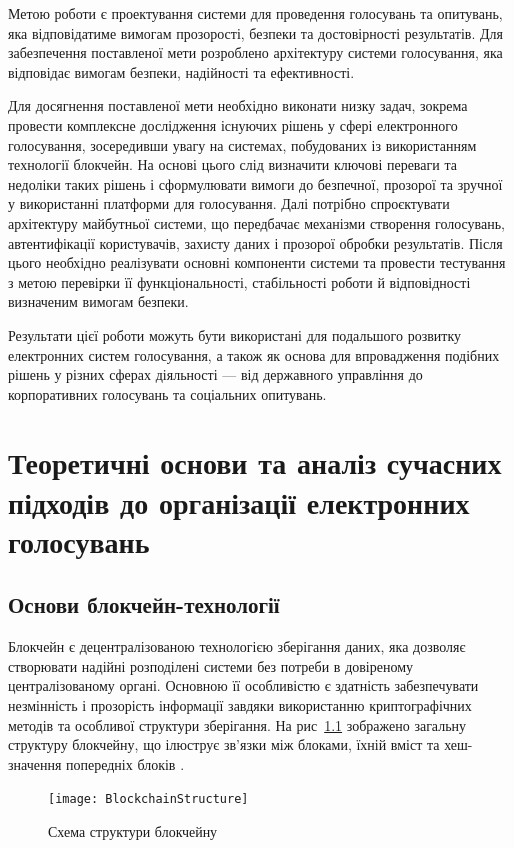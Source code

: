 \documentclass[14pt]{extreport}
\begin{document}
  Метою роботи є проектування системи для проведення голосувань та опитувань, яка відповідатиме вимогам прозорості, безпеки та достовірності результатів. Для забезпечення поставленої мети розроблено архітектуру системи голосування, яка відповідає вимогам безпеки, надійності та ефективності.

  Для досягнення поставленої мети необхідно виконати низку задач, зокрема провести комплексне дослідження існуючих рішень у сфері електронного голосування, зосередивши увагу на системах, побудованих із використанням технології блокчейн. На основі цього слід визначити ключові переваги та недоліки таких рішень і сформулювати вимоги до безпечної, прозорої та зручної у використанні платформи для голосування. Далі потрібно спроєктувати архітектуру майбутньої системи, що передбачає механізми створення голосувань, автентифікації користувачів, захисту даних і прозорої обробки результатів. Після цього необхідно реалізувати основні компоненти системи та провести тестування з метою перевірки її функціональності, стабільності роботи й відповідності визначеним вимогам безпеки.

  Результати цієї роботи можуть бути використані для подальшого розвитку електронних систем голосування, а також як основа для впровадження подібних рішень у різних сферах діяльності — від державного управління до корпоративних голосувань та соціальних опитувань.
  
  \chapter{Теоретичні основи та аналіз сучасних підходів до організації електронних голосувань}
  
  \section{Основи блокчейн-технології}

  Блокчейн є децентралізованою технологією зберігання даних, яка дозволяє створювати надійні розподілені системи без потреби в довіреному централізованому органі. Основною її особливістю є здатність забезпечувати незмінність і прозорість інформації завдяки використанню криптографічних методів та особливої структури зберігання. На рис~\ref{fig:blockchain} зображено загальну структуру блокчейну, що ілюструє зв’язки між блоками, їхній вміст та хеш-значення попередніх блоків \cite{blockchain_structure}.

  \begin{figure}[H]
    \centering
    \texttt{[image: BlockchainStructure]}
    \caption{Схема структури блокчейну}
    \label{fig:blockchain}
  \end{figure}
\end{document}
